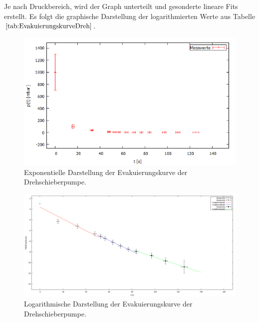 Je nach Druckbereich, wird der Graph unterteilt und gesonderte lineare Fits erstellt.
Es folgt die graphische Darstellung der logarithmierten Werte aus Tabelle $\ref{tab:EvakuierungskurveDreh}$.

\begin{figure}[H]
  \centering
  \includegraphics[width=14cm]{bilder/drehexpo.png}
  \caption{Exponentielle Darstellung der Evakuierungskurve der Drehschieberpumpe.}
  \label{expoevakuierungdreh}
\end{figure}
\begin{figure}[H]
  \centering
  \includegraphics[width=14cm]{bilder/evakuierung Dreh.png}
  \caption{Logarithmische Darstellung der Evakuierungskurve der Drehschieberpumpe.}
  \label{evakuierungdreh}
\end{figure}

